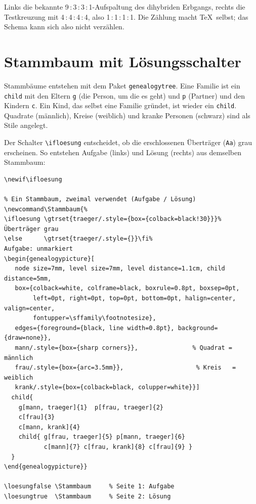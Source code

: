 Links die bekannte 9\,:\,3\,:\,3\,:\,1-Aufspaltung des dihybriden Erbgangs, rechts die Testkreuzung mit 4\,:\,4\,:\,4\,:\,4, also 1\,:\,1\,:\,1\,:\,1. Die Zählung macht \TeX\ selbst; das Schema kann sich also nicht verzählen.




\section{Stammbaum mit Lösungsschalter}

Stammbäume entstehen mit dem Paket \texttt{genealogytree}. Eine Familie ist ein \texttt{child} mit den Eltern \texttt{g} (die Person, um die es geht) und \texttt{p} (Partner) und den Kindern \texttt{c}. Ein Kind, das selbst eine Familie gründet, ist wieder ein \texttt{child}. Quadrate (männlich), Kreise (weiblich) und kranke Personen (schwarz) sind als Stile angelegt.

Der Schalter \texttt{\textbackslash ifloesung} entscheidet, ob die erschlossenen Überträger (\texttt{Aa}) grau erscheinen. So entstehen Aufgabe (links) und Lösung (rechts) aus demselben Stammbaum:

\begin{lstlisting}[style=latex]
\newif\ifloesung

% Ein Stammbaum, zweimal verwendet (Aufgabe / Lösung)
\newcommand\Stammbaum{%
\ifloesung \gtrset{traeger/.style={box={colback=black!30}}}%   Überträger grau
\else      \gtrset{traeger/.style={}}\fi%                       Aufgabe: unmarkiert
\begin{genealogypicture}[
   node size=7mm, level size=7mm, level distance=1.1cm, child distance=5mm,
   box={colback=white, colframe=black, boxrule=0.8pt, boxsep=0pt,
        left=0pt, right=0pt, top=0pt, bottom=0pt, halign=center, valign=center,
        fontupper=\sffamily\footnotesize},
   edges={foreground={black, line width=0.8pt}, background={draw=none}},
   mann/.style={box={sharp corners}},               % Quadrat = männlich
   frau/.style={box={arc=3.5mm}},                    % Kreis   = weiblich
   krank/.style={box={colback=black, colupper=white}}]
  child{
    g[mann, traeger]{1}  p[frau, traeger]{2}
    c[frau]{3}
    c[mann, krank]{4}
    child{ g[frau, traeger]{5} p[mann, traeger]{6}
           c[mann]{7} c[frau, krank]{8} c[frau]{9} }
  }
\end{genealogypicture}}

\loesungfalse \Stammbaum     % Seite 1: Aufgabe
\loesungtrue  \Stammbaum     % Seite 2: Lösung
\end{lstlisting}

